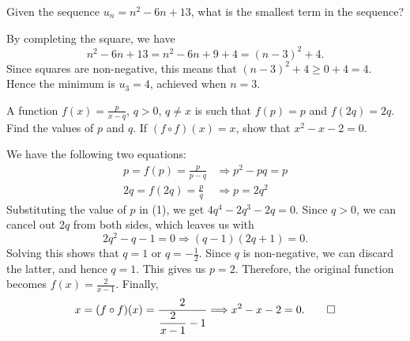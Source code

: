 \begin{question}
    Given the sequence $u_{n} = n^2 - 6n + 13$, what is the smallest term in
    the sequence? 
\end{question}
\begin{solution}
    By completing the square, we have
    \[n^2 - 6n + 13 = n^2 - 6n + 9 + 4 = (n - 3)^2 + 4.\]
    Since squares are non-negative, this means that $(n - 3)^2 + 4 \geq 0 + 4 =
    4$. Hence the minimum is $u_3 = 4$, achieved when $n = 3$. 
\end{solution}

\begin{question}
    A function $f(x) = \frac{p}{x - q}$, $q > 0$, $q \ne x$ is such that $f(p)
    = p$ and $f(2q) = 2q$. Find the values of $p$ and $q$. If $(f \circ f)(x) =
    x$, show that $x^2 - x - 2 = 0$.
\end{question}
\begin{solution}
    We have the following two equations:
    \begin{align}
        p = f(p) = \frac{p}{p - q} &\Longrightarrow p^2 - pq = p\\
        2q = f(2q) = \frac{p}{q} &\Longrightarrow p = 2q^2
    \end{align}
    Substituting the value of $p$ in (1), we get $4q^4 - 2q^3 - 2q = 0.$ Since
    $q > 0$, we can cancel out $2q$ from both sides, which leaves us with 
    \[2q^2 - q - 1 = 0 \Longrightarrow (q - 1)(2q + 1) = 0.\] 
    Solving this shows that $q = 1$ or $q = -\frac{1}{2}$. Since $q$ is
    non-negative, we can discard the latter, and hence $q = 1$. This gives us
    $p = 2$. Therefore, the original function becomes $f(x) = \frac{2}{x - 1}$.
    Finally, 
    \[ x = (f \circ f)(x) = \frac{2}{\dfrac{2}{x - 1} - 1} \Longrightarrow x^2
    - x - 2 = 0. \qedhere \]
\end{solution}

